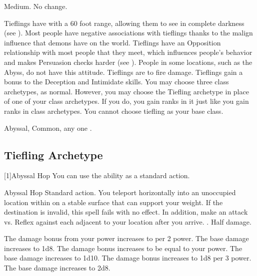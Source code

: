      Medium.
     No change.
    \begin{itemize}
         Tieflings have  with a 60 foot range, allowing them to see in complete darkness (see ).
         Most people have negative associations with tieflings thanks to the malign influence that demons have on the world.
            Tieflings have an Opposition relationship with most people that they meet, which influences people's behavior and makes Persuasion checks harder (see ).
            People in some locations, such as the Abyss, do not have this attitude.
         Tieflings are  to fire damage.
         Tieflings gain a  bonus to the Deception and Intimidate skills.
         You may choose three class archetypes, as normal.
            However, you may choose the Tiefling archetype in place of one of your class archetypes.
            If you do, you gain ranks in it just like you gain ranks in class archetypes.
            You cannot choose tiefling as your base class.
    \end{itemize}
     Abyssal, Common, any one .

    \subsection{Tiefling Archetype}
        [1]{Abyssal Hop} You can use the  ability as a standard action.
        \begin{magicalactiveability}{Abyssal Hop}
            \abilityusagetime Standard action.
            \rankline
            You teleport horizontally into an unoccupied location within \shortrange on a stable surface that can support your weight.
            If the destination is invalid, this spell fails with no effect.
            In addition, make an attack vs. Reflex against each  adjacent to your location after you arrive.
            \hit {}.
            \miss Half damage.

            \rankline
             The damage bonus from your power increases to  per 2 power.
             The base damage increases to 1d8.
             The damage bonus increases to be equal to your power.
             The base damage increases to 1d10.
             The damage bonus increases to 1d8 per 3 power.
             The base damage increases to 2d8.
        \end{magicalactiveability}

